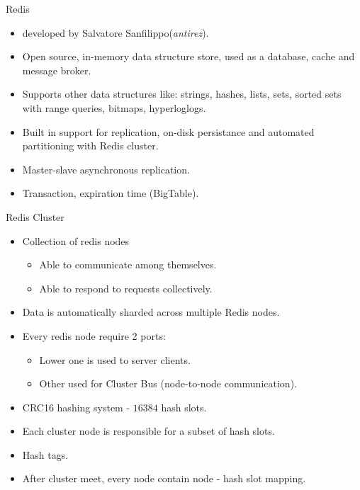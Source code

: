\documentclass{beamer}
\begin{document}
\begin{frame}{Redis}
    \begin{itemize}
        \pause\item developed by Salvatore Sanfilippo(\textit{antirez}).
        \pause\item Open source, in-memory data structure store, used as a database, cache and message broker.
        \pause\item Supports other data structures like: strings, hashes, lists, sets, sorted sets with range queries, bitmaps, hyperloglogs.
        \pause\item Built in support for replication, on-disk persistance and automated partitioning with Redis cluster.
        \pause\item Master-slave asynchronous replication.
        \pause\item Transaction, expiration time (BigTable).
    \end{itemize}
\end{frame}

\begin{frame}{Redis Cluster}
    \begin{itemize}
        \pause\item Collection of redis nodes
            \begin{itemize}
                \pause\item Able to communicate among themselves.
                \pause\item Able to respond to requests collectively.
            \end{itemize}
        \pause\item Data is automatically sharded across multiple Redis nodes.
        \pause\item Every redis node require 2 ports:
            \begin{itemize}
                \pause\item Lower one is used to server clients.
                \pause\item Other used for Cluster Bus (node-to-node communication).
            \end{itemize}
        \pause\item CRC16 hashing system - $16384$ hash slots.
        \pause\item Each cluster node is responsible for a subset of hash slots.
        \pause\item Hash tags.
        \pause\item After cluster meet, every node contain node - hash slot mapping.
    \end{itemize}
\end{frame}
\end{document}
